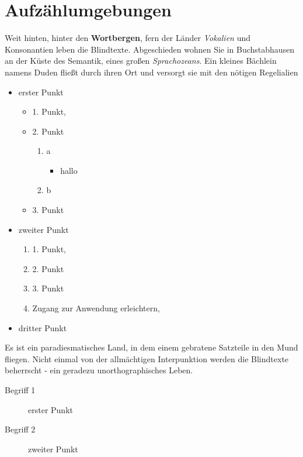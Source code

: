 \documentclass[%
	12pt,%
	a4paper,%
	oneside,%
 liststotoc, idxtotoc, bibtotoc, %
	halfparskip,%
	nochapterprefix,%
	appendixprefix, %
smallheadings,%
]{scrreprt}
\begin{document}
\chapter{Aufzählumgebungen}
\label{sec:Aufzaehlumgebung}

Weit hinten, hinter den \textbf{Wortbergen}, fern der Länder \textit{Vokalien} und Konsonantien leben die Blindtexte. Abgeschieden wohnen Sie in Buchstabhausen an der Küste des Semantik, eines großen \textsl{Sprachozeans}. Ein kleines Bächlein namens Duden fließt durch ihren Ort und versorgt sie mit den nötigen Regelialien %

\begin{itemize}
	\item erster Punkt
	\begin{itemize}
		\item 1. Punkt,
		\item 2. Punkt
		\begin{enumerate}
			\item a
			\begin{itemize}
				\item hallo
			\end{itemize}
						\item b
		\end{enumerate}
		\item 3. Punkt
	\end{itemize}
	\item zweiter Punkt
	\begin{enumerate}
		\item 1. Punkt,
		\item 2. Punkt
		\item 3. Punkt
		\item Zugang zur Anwendung erleichtern,
	\end{enumerate}
	\item dritter Punkt
\end{itemize}

Es ist ein paradiesmatisches Land, in dem einem gebratene Satzteile in den Mund fliegen. Nicht einmal von der allmächtigen Interpunktion werden die Blindtexte beherrscht - ein geradezu unorthographisches Leben. 

\begin{description}
	\item[Begrif\/f 1] erster Punkt
	\item[Begrif\/f 2] zweiter Punkt 
\end{description}
\end{document}
